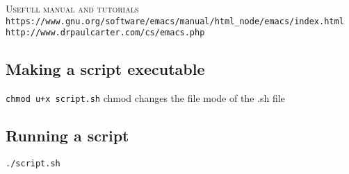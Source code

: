 \documentclass[12pt]{article}
\begin{document}
\textsc{Usefull manual and tutorials}\\
\verb"https://www.gnu.org/software/emacs/manual/html_node/emacs/index.html"\\
\verb"http://www.drpaulcarter.com/cs/emacs.php"\\


\subsection{Making a script executable}

\verb"chmod u+x script.sh"
{\color{blue} chmod changes the file mode of the .sh file}

\subsection{Running a script}
 \verb+./script.sh+
\end{document}
